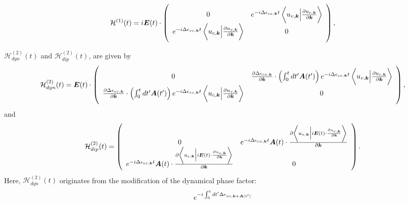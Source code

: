 \begin{align}
\mathcal{H}^{(1)}(t) = i \boldsymbol E(t)\cdot 
\left(
    \begin{array}{cc}
      0 & 
      e^{-i \Delta \epsilon_{cv,\boldsymbol k}t} 
  \left \langle u_{v,\boldsymbol k}\Big |\frac{\partial u_{c,\boldsymbol k}}{\partial \boldsymbol k} \right \rangle \\
      e^{-i\Delta \epsilon_{vc,\boldsymbol k}t}
  \left \langle u_{c,\boldsymbol k}\Big |\frac{\partial u_{v,\boldsymbol k}}{\partial \boldsymbol k} \right \rangle &
      0
    \end{array}
    \right),
\end{align}

$\mathcal{H}^{(2)}_{dyn}(t)$ and $\mathcal{H}^{(2)}_{dip}(t)$, are given by
\begin{align}
\mathcal{H}^{(2)}_{dyn}(t) =   \boldsymbol E(t)\cdot 
\left(
    \begin{array}{cc}
      0 & 
      \frac{\partial \Delta \epsilon_{cv,\boldsymbol k}}{\partial \boldsymbol k}\cdot \left ( \int^t_0 dt' \boldsymbol A(t') \right )e^{-i \Delta \epsilon_{cv,\boldsymbol k}t} 
  \left \langle u_{v,\boldsymbol k}\Big |\frac{\partial u_{c,\boldsymbol k}}{\partial \boldsymbol k} \right \rangle \\
  \frac{\partial \Delta \epsilon_{vc,\boldsymbol k}}{\partial \boldsymbol k} \cdot \left ( \int^t_0dt' \boldsymbol A(t')\right )e^{-i\Delta \epsilon_{vc,\boldsymbol k}t}
  \left \langle u_{c,\boldsymbol k}\Big |\frac{\partial u_{v,\boldsymbol k}}{\partial \boldsymbol k} \right \rangle &
      0
    \end{array}
    \right),
\end{align}
and 
\begin{align}
\mathcal{H}^{(2)}_{dip}(t) =  
\left(
    \begin{array}{cc}
      0 & 
      e^{-i \Delta \epsilon_{cv,\boldsymbol k}t} 
      \boldsymbol A(t) \cdot \frac{\partial 
  \left \langle u_{v,\boldsymbol k}\Big |i \boldsymbol E(t)\cdot  \frac{\partial u_{c,\boldsymbol k}}{\partial \boldsymbol k} \right \rangle 
 }{\partial \boldsymbol k} 
\\
      e^{-i\Delta \epsilon_{vc,\boldsymbol k}t}
      \boldsymbol A(t) \cdot \frac{\partial
  \left \langle u_{c,\boldsymbol k}\Big |i \boldsymbol E(t)\cdot \frac{\partial u_{v,\boldsymbol k}}{\partial \boldsymbol k} \right \rangle
}{\partial \boldsymbol k} 
 &
      0
    \end{array}
    \right).
\end{align}
Here, $\mathcal{H}^{(2)}_{dyn}(t)$ originates from the modification of the dynamical phase factor:
\begin{align}
e^{-i\int^t_0dt' \Delta \epsilon_{vc,\boldsymbol k+ \boldsymbol A(t')}}  
\end{align}

